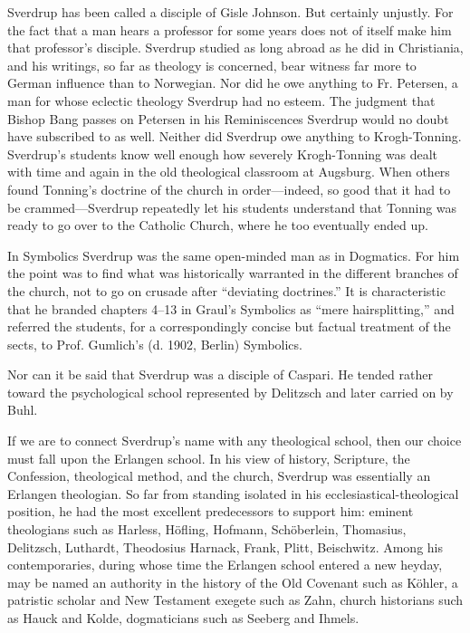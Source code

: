 Sverdrup has been called a disciple of Gisle Johnson. But certainly unjustly. For the fact that a man hears a professor for some years does not of itself make him that professor’s disciple. Sverdrup studied as long abroad as he did in Christiania, and his writings, so far as theology is concerned, bear witness far more to German influence than to Norwegian. Nor did he owe anything to Fr. Petersen, a man for whose eclectic theology Sverdrup had no esteem. The judgment that Bishop Bang passes on Petersen in his Reminiscences Sverdrup would no doubt have subscribed to as well. Neither did Sverdrup owe anything to Krogh-Tonning. Sverdrup’s students know well enough how severely Krogh-Tonning was dealt with time and again in the old theological classroom at Augsburg. When others found Tonning’s doctrine of the church in order—indeed, so good that it had to be crammed—Sverdrup repeatedly let his students understand that Tonning was ready to go over to the Catholic Church, where he too eventually ended up.

In Symbolics Sverdrup was the same open-minded man as in Dogmatics. For him the point was to find what was historically warranted in the different branches of the church, not to go on crusade after “deviating doctrines.” It is characteristic that he branded chapters 4–13 in Graul’s Symbolics as “mere hairsplitting,” and referred the students, for a correspondingly concise but factual treatment of the sects, to Prof. Gumlich’s (d. 1902, Berlin) Symbolics.

Nor can it be said that Sverdrup was a disciple of Caspari. He tended rather toward the psychological school represented by Delitzsch and later carried on by Buhl.

If we are to connect Sverdrup’s name with any theological school, then our choice must fall upon the Erlangen school. In his view of history, Scripture, the Confession, theological method, and the church, Sverdrup was essentially an Erlangen theologian. So far from standing isolated in his ecclesiastical-theological position, he had the most excellent predecessors to support him: eminent theologians such as Harless, Höfling, Hofmann, Schöberlein, Thomasius, Delitzsch, Luthardt, Theodosius Harnack, Frank, Plitt, Beischwitz. Among his contemporaries, during whose time the Erlangen school entered a new heyday, may be named an authority in the history of the Old Covenant such as Köhler, a patristic scholar and New Testament exegete such as Zahn, church historians such as Hauck and Kolde, dogmaticians such as Seeberg and Ihmels.

